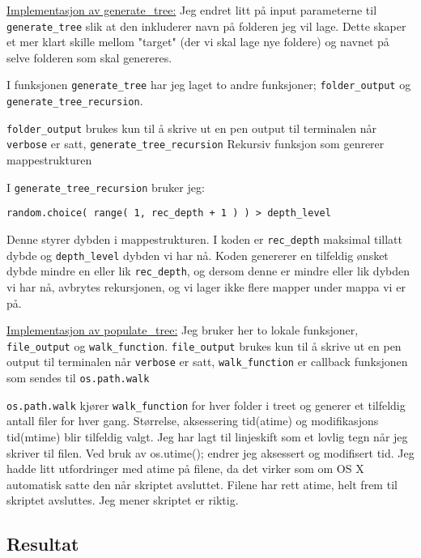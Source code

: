 \documentclass{article}
\begin{document}
\underline{Implementasjon av generate\_tree:}
Jeg endret litt på input parameterne til \verb;generate_tree; slik at den inkluderer navn på folderen jeg vil lage. Dette skaper et mer klart skille mellom "target" (der vi skal lage nye foldere) og navnet på selve folderen som skal genereres.

I funksjonen \verb;generate_tree; har jeg laget to andre funksjoner; \verb;folder_output; og \verb;generate_tree_recursion;.\par
\verb;folder_output; brukes kun til å skrive ut en pen output til terminalen når \verb;verbose; er satt, \verb;generate_tree_recursion; Rekursiv funksjon som genrerer mappestrukturen

I \verb;generate_tree_recursion; bruker jeg:\par \verb;random.choice( range( 1, rec_depth + 1 ) ) > depth_level ;\par Denne  styrer dybden i mappestrukturen. I koden er \verb;rec_depth; maksimal tillatt dybde og \verb;depth_level; dybden vi har nå. Koden genererer en tilfeldig ønsket dybde mindre en eller lik \verb;rec_depth;, og dersom denne er mindre eller lik dybden vi har nå, avbrytes rekursjonen, og vi lager ikke flere mapper under mappa vi er på. 

\underline{Implementasjon av populate\_tree:}
Jeg bruker her to lokale funksjoner, \verb;file_output; og \verb;walk_function;. 
\verb;file_output; brukes kun til å skrive ut en pen output til terminalen når \verb;verbose; er satt,
\verb;walk_function; er callback funksjonen som sendes til \verb;os.path.walk;\par

\verb;os.path.walk; kjører \verb;walk_function; for hver folder i treet og generer et tilfeldig antall filer for hver gang.
Størrelse, aksessering tid(atime) og modifikasjons tid(mtime) blir tilfeldig valgt. 
Jeg har lagt til linjeskift som et lovlig tegn når jeg skriver til filen.
Ved bruk av os.utime(); endrer jeg aksessert og modifisert tid.\newline
Jeg hadde litt utfordringer med atime på filene, da det virker som om OS X automatisk satte den når skriptet avsluttet. Filene har rett atime, helt frem til skriptet avsluttes. Jeg mener skriptet er riktig.



\subsection{Resultat}
\end{document}
